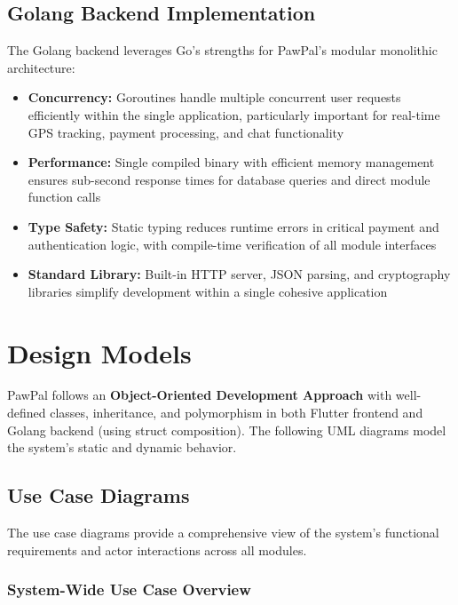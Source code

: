 \subsection{Golang Backend Implementation}

The Golang backend leverages Go's strengths for PawPal's modular monolithic architecture:

\begin{itemize}
    \item \textbf{Concurrency:} Goroutines handle multiple concurrent user requests efficiently within the single application, particularly important for real-time GPS tracking, payment processing, and chat functionality
    \item \textbf{Performance:} Single compiled binary with efficient memory management ensures sub-second response times for database queries and direct module function calls
    \item \textbf{Type Safety:} Static typing reduces runtime errors in critical payment and authentication logic, with compile-time verification of all module interfaces
    \item \textbf{Standard Library:} Built-in HTTP server, JSON parsing, and cryptography libraries simplify development within a single cohesive application

\end{itemize}



\section{Design Models}

PawPal follows an \textbf{Object-Oriented Development Approach} with well-defined classes, inheritance, and polymorphism in both Flutter frontend and Golang backend (using struct composition). The following UML diagrams model the system's static and dynamic behavior.

\subsection{Use Case Diagrams}

The use case diagrams provide a comprehensive view of the system's functional requirements and actor interactions across all modules.

\subsubsection{System-Wide Use Case Overview}

